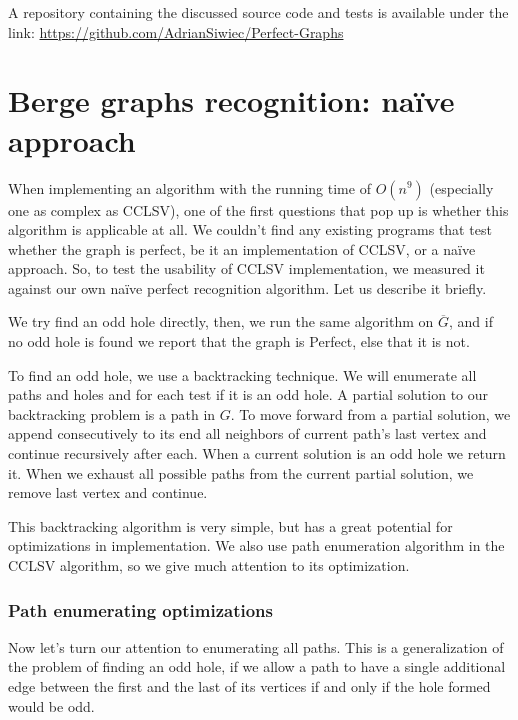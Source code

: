 A repository containing the discussed source code and tests is available under the link: \href{https://github.com/AdrianSiwiec/Perfect-Graphs}{https://github.com/AdrianSiwiec/Perfect-Graphs}

\section{Berge graphs recognition: na\"ive approach}
When implementing an algorithm with the running time of $O(n^9)$ (especially one as complex as CCLSV), one of the first questions that pop up is whether this algorithm is applicable at all. We couldn't find any existing programs that test whether the graph is perfect, be it an implementation of CCLSV, or a na\"ive approach. So, to test the usability of CCLSV implementation, we measured it against our own na\"ive perfect recognition algorithm. Let us describe it briefly.

We try find an odd hole directly, then, we run the same algorithm on $\overline{G}$, and if no odd hole is found we report that the graph is Perfect, else that it is not.

To find an odd hole, we use a backtracking technique. We will enumerate all paths and holes and for each test if it is an odd hole. A partial solution to our backtracking problem is a path in $G$. To move forward from a partial solution, we append consecutively to its end all neighbors of current path's last vertex and continue recursively after each. When a current solution is an odd hole we return it. When we exhaust all possible paths from the current partial solution, we remove last vertex and continue.

This backtracking algorithm is very simple, but has a great potential for optimizations in implementation. We also use path enumeration algorithm in the CCLSV algorithm, so we give much attention to its optimization.

\subsubsection{Path enumerating optimizations}
Now let's turn our attention to enumerating all paths. This is a generalization of the problem of finding an odd hole, if we allow a path to have a single additional edge between the first and the last of its vertices if and only if the hole formed would be odd.

